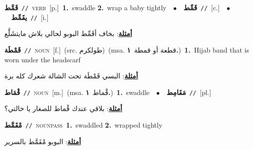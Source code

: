 \documentclass[10pt,a4paper,twoside]{article} %
\begin{document}
\begin{multicols}{2}
{\setlength\topsep{0pt}\textbf{\foreignlanguage{arabic}{قَمَّط}}\ {\color{gray}\texttt{//}\color{black}}\ \textsc{verb}\ [p.]\ \textbf{1.}~swaddle  \textbf{2.}~wrap a baby tightly\ \ $\bullet$\ \ \setlength\topsep{0pt}\textbf{\foreignlanguage{arabic}{قَمِّط}}\ {\color{gray}\texttt{//}\color{black}}\ [c.]\ \ $\bullet$\ \ \setlength\topsep{0pt}\textbf{\foreignlanguage{arabic}{يقَمِّط}}\ {\color{gray}\texttt{//}\color{black}}\ [i.]\  \begin{flushright}\color{gray}\foreignlanguage{arabic}{\textbf{\underline{\foreignlanguage{arabic}{أمثلة}}}: بخاف أقَمِّط البوبو لحالي بلاش مايتشَلَّع}\end{flushright}\color{black}} \vspace{2mm}

{\setlength\topsep{0pt}\textbf{\foreignlanguage{arabic}{قَمْطَة}}\ {\color{gray}\texttt{//}\color{black}}\ \textsc{noun}\ [f.]\ (src. \color{gray}\foreignlanguage{arabic}{طولكرم}\color{black})\ \color{gray}(msa. \foreignlanguage{arabic}{قطعة أو قمطة}~\foreignlanguage{arabic}{\textbf{١.}})\color{black}\ \textbf{1.}~Hijab band that is worn under the headscarf\  \begin{flushright}\color{gray}\foreignlanguage{arabic}{\textbf{\underline{\foreignlanguage{arabic}{أمثلة}}}: البسي قَمْطَة تحت الشالة شعرك كله برة}\end{flushright}\color{black}} \vspace{2mm}

{\setlength\topsep{0pt}\textbf{\foreignlanguage{arabic}{قْمَاط}}\ {\color{gray}\texttt{//}\color{black}}\ \textsc{noun}\ [m.]\ \color{gray}(msa. \foreignlanguage{arabic}{قْماط}~\foreignlanguage{arabic}{\textbf{١.}})\color{black}\ \textbf{1.}~swaddle\ \ $\bullet$\ \ \setlength\topsep{0pt}\textbf{\foreignlanguage{arabic}{مَقَامِط}}\ {\color{gray}\texttt{//}\color{black}}\ [pl.]\  \begin{flushright}\color{gray}\foreignlanguage{arabic}{\textbf{\underline{\foreignlanguage{arabic}{أمثلة}}}: بلاقي عندك قْماط للصغار يا خالتي؟}\end{flushright}\color{black}} \vspace{2mm}

{\setlength\topsep{0pt}\textbf{\foreignlanguage{arabic}{مْقَمَّط}}\ {\color{gray}\texttt{//}\color{black}}\ \textsc{noun\textunderscore pass}\ \textbf{1.}~swaddled  \textbf{2.}~wrapped tightly\  \begin{flushright}\color{gray}\foreignlanguage{arabic}{\textbf{\underline{\foreignlanguage{arabic}{أمثلة}}}: البوبو مْقَمَّط بالسرير}\end{flushright}\color{black}} \vspace{2mm}


\end{multicols}
\end{document}
